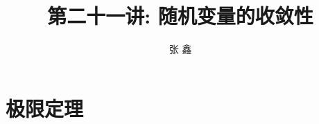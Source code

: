 \documentclass[Prob-All.tex]{subfiles}
\begin{document}
\title[概率论]{第二十一讲: 随机变量的收敛性}
\author[张鑫{\rm Email: x.zhang.seu@foxmail.com}]{\large 张 鑫}
\date{}



{ 
	\begin{frame}
		\titlepage
	\end{frame}
}





\section{极限定理}
\end{document}
